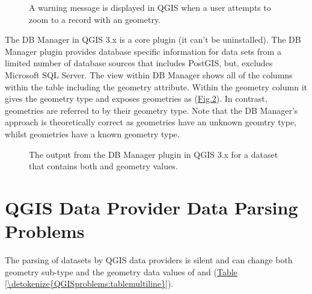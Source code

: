 \documentclass[a4paper,11pt,english]{sphinxmanual}
\begin{document}
\begin{figure}[htbp]
\centering
\capstart

\noindent{}
\caption{A warning message is displayed in QGIS when a user attempts to zoom to a record with an  geometry.}\label{\detokenize{background:id43}}\label{\detokenize{background:figureiii}}\end{figure}

The DB Manager in QGIS 3.x is a core plugin (it can’t be uninstalled).  The DB Manager plugin provides database specific information for data sets from a limited number of database sources that includes PostGIS, but, excludes Microsoft SQL Server.  The  view within DB Manager shows all of the columns within the table including the geometry attribute.  Within the geometry column it gives the geometry type and exposes  geometries as  (\hyperref[\detokenize{background:figureiv}]{Fig.\@ \ref{\detokenize{background:figureiv}}}).  In contrast,  geometries are referred to by their geometry type.  Note that the DB Manager’s approach is theoretically correct as  geometries have an unknown geomtry type, whilst  geometries have a known geometry type.

\begin{figure}[htbp]
\centering
\capstart

\noindent{}
\caption{The output from the DB Manager plugin in QGIS 3.x for a dataset that contains both  and  geometry values.}\label{\detokenize{background:id44}}\label{\detokenize{background:figureiv}}\end{figure}


\chapter{QGIS Data Provider Data Parsing Problems}
\label{\detokenize{QGISproblems:qgis-data-provider-data-parsing-problems}}\label{\detokenize{QGISproblems::doc}}
The parsing of datasets by QGIS data providers is silent and can change both geometry sub-type and the geometry data values of  and  (\hyperref[\detokenize{QGISproblems:tablemultiline}]{Table \ref{\detokenize{QGISproblems:tablemultiline}}}).
\end{document}
